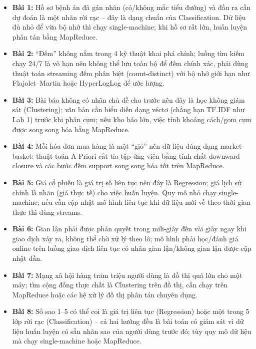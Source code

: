 \documentclass[12pt,a4paper,oneside]{article}
\begin{document}
\begin{itemize}
  \item \textbf{Bài 1:} Hồ sơ bệnh án đã gán nhãn (có/không mắc tiểu đường) và đầu ra cần dự đoán là một nhãn rời rạc -- đây là dạng chuẩn của Classification. Dữ liệu đủ nhỏ để vừa bộ nhớ thì chạy single-machine; khi hồ sơ rất lớn, huấn luyện phân tán bằng MapReduce.
  \item \textbf{Bài 2:} ``Đếm'' không nằm trong 4 kỹ thuật khai phá chính; luồng tìm kiếm chạy 24/7 là vô hạn nên không thể lưu toàn bộ để đếm chính xác, phải dùng thuật toán streaming đếm phân biệt (count-distinct) với bộ nhớ giới hạn như Flajolet--Martin hoặc HyperLogLog để ước lượng.
  \item \textbf{Bài 3:} Bài báo không có nhãn chủ đề cho trước nên đây là học không giám sát (Clustering); văn bản cần biểu diễn dạng véctơ (chẳng hạn TF.IDF như Lab 1) trước khi phân cụm; nếu kho báo lớn, việc tính khoảng cách/gom cụm được song song hóa bằng MapReduce.
  \item \textbf{Bài 4:} Mỗi hóa đơn mua hàng là một ``giỏ'' nên dữ liệu đúng dạng market-basket; thuật toán A-Priori cắt tỉa tập ứng viên bằng tính chất downward closure và các bước đếm support song song hóa tốt trên MapReduce.
  \item \textbf{Bài 5:} Giá cổ phiếu là giá trị số liên tục nên đây là Regression; giá lịch sử chính là nhãn (giá thực tế) cho việc huấn luyện. Quy mô nhỏ chạy single-machine; nếu cần cập nhật mô hình liên tục khi dữ liệu mới về theo thời gian thực thì dùng streams.
  \item \textbf{Bài 6:} Gian lận phải được phán quyết trong mili-giây đến vài giây ngay khi giao dịch xảy ra, không thể chờ xử lý theo lô; mô hình phải học/đánh giá online trên luồng giao dịch liên tục có nhãn gian lận/không gian lận được cập nhật dần.
  \item \textbf{Bài 7:} Mạng xã hội hàng trăm triệu người dùng là đồ thị quá lớn cho một máy; tìm cộng đồng thực chất là Clustering trên đồ thị, cần chạy trên MapReduce hoặc các hệ xử lý đồ thị phân tán chuyên dụng.
  \item \textbf{Bài 8:} Số sao 1--5 có thể coi là giá trị liên tục (Regression) hoặc một trong 5 lớp rời rạc (Classification) -- cả hai hướng đều là bài toán có giám sát vì dữ liệu huấn luyện có sẵn nhãn sao của người dùng trước đó; tùy quy mô dữ liệu mà chạy single-machine hoặc MapReduce.
\end{itemize}

\end{document}
